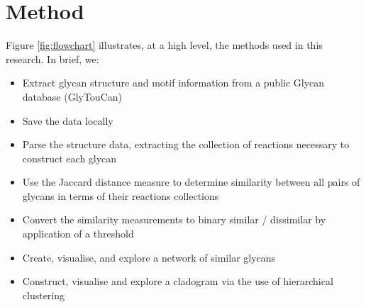 \documentclass[12pt,a4paper]{article}
\begin{document}


\newpage
\section{Method}
\label{sec:method}

Figure \ref{fig:flowchart} illustrates, at a high level, the methods used in this research. In brief, we:

\begin{itemize}
\item Extract glycan structure and motif information from a public Glycan database (GlyTouCan)
\item Save the data locally
\item Parse the structure data, extracting the collection of reactions necessary to construct each glycan
\item Use the Jaccard distance measure to determine similarity between all pairs of glycans in terms of their reactions collections
\item Convert the similarity measurements to binary similar / dissimilar by application of a threshold
\item Create, visualise, and explore a network of similar glycans 
\item Construct, visualise and explore a cladogram via the use of hierarchical clustering
\end{itemize}
\end{document}
